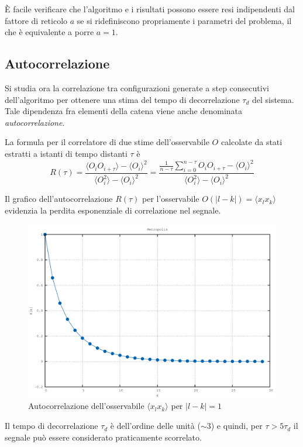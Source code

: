 È facile verificare che l'algoritmo e i risultati possono essere resi indipendenti dal fattore di reticolo $a$ se si ridefiniscono propriamente i parametri del problema, il che è equivalente a porre $a=1$.

\subsection{Autocorrelazione}

Si studia ora la correlazione tra configurazioni generate a step consecutivi dell'algoritmo per ottenere una stima del tempo di decorrelazione $\tau_d$ del sistema. Tale dipendenza fra elementi della catena viene anche denominata \textit{autocorrelazione}.

La formula per il correlatore di due stime dell'osservabile $O$ calcolate da stati estratti a istanti di tempo distanti $\tau$ è
$$R(\tau)=\frac{\langle O_iO_{i+\tau}\rangle-\langle O_i\rangle^2}{\langle O_i^2\rangle-\langle O_i\rangle^2}=\frac{\frac{1}{n-\tau}\sum\limits_{i=0}^{n-\tau}O_iO_{i+\tau}-\langle O_i\rangle^2}{\langle O_i^2\rangle-\langle O_i\rangle^2}$$

Il grafico dell'autocorrelazione $R(\tau)$ per l'osservabile $O(|l-k|)=\langle x_lx_k\rangle$ evidenzia la perdita esponenziale di correlazione nel segnale.
\begin{figure}[H]
\centering
\includegraphics[width=\textwidth]{autocorrelation}
\caption{Autocorrelazione dell'osservabile $\langle x_lx_k\rangle$ per $|l-k|=1$}
\label{fig:autocorrelation}
\end{figure}
Il tempo di decorrelazione $\tau_d$ è dell'ordine delle unità ($\sim3$) e quindi, per $\tau>5\tau_d$ il segnale può essere considerato praticamente scorrelato.

